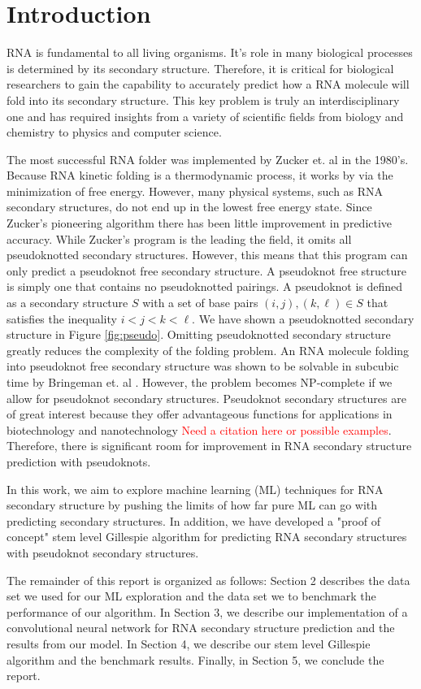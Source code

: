 \documentclass[11pt]{article}
\begin{document}
\section{Introduction}
\begin{multicols}{2}
RNA is fundamental to all living organisms. It's role in many biological processes is determined by its secondary structure. Therefore, it is critical for biological researchers to gain the capability to accurately predict how a RNA molecule will fold into its secondary structure. This key problem is truly an interdisciplinary one and has required insights from a variety of scientific fields from biology and chemistry to physics and computer science. 

The most successful RNA folder was implemented by Zucker et. al \cite{ZUKER1984591} in the 1980's. Because RNA kinetic folding is a thermodynamic process, it works by via the minimization of free energy. However, many physical systems, such as RNA secondary structures, do not end up in the lowest free energy state. Since Zucker's pioneering algorithm there has been little improvement in predictive accuracy. While Zucker's program is the leading the field, it omits all pseudoknotted secondary structures. However, this means that this program can only predict a pseudoknot free secondary structure. A pseudoknot free structure is simply one that contains no pseudoknotted pairings. A pseudoknot is defined as a secondary structure $S$ with a set of base pairs $(i, j), (k, \ell) \in S$ that satisfies the inequality $i< j < k < \ell$. We have shown a pseudoknotted secondary structure in Figure \ref{fig:pseudo}. Omitting pseudoknotted secondary structure greatly reduces the complexity of the folding problem. An RNA molecule folding into pseudoknot free secondary structure was shown to be solvable in subcubic time by Bringeman et. al \cite{BringmannGSW17}. However, the problem becomes NP-complete if we allow for pseudoknot secondary structures. Pseudoknot secondary structures are of great interest because they offer advantageous functions for applications in biotechnology and nanotechnology \textcolor{red}{Need a citation here or possible examples}. Therefore, there is significant room for improvement in RNA secondary structure prediction with pseudoknots.

In this work, we aim to explore machine learning (ML) techniques for RNA secondary structure by pushing the limits of how far pure ML can go with predicting secondary structures. In addition, we have developed a "proof of concept" stem level Gillespie algorithm for predicting RNA secondary structures with pseudoknot secondary structures.

The remainder of this report is organized as follows: Section 2 describes the data set we used for our ML exploration and the data set we to benchmark the performance of our algorithm. In Section 3, we describe our implementation of a convolutional neural network for RNA secondary structure prediction and the results from our model. In Section 4, we describe our stem level Gillespie algorithm and the benchmark results. Finally, in Section 5, we conclude the report. 
\end{multicols}
\end{document}
